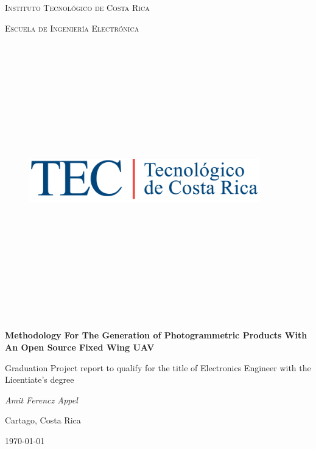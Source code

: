 \begin{titlepage}
	\centering
	{\scshape\LARGE Instituto Tecnológico de Costa Rica \par}
	\vspace{1cm}
    {\scshape\Large Escuela de Ingeniería Electrónica \par}
    \vspace{1cm}
    
    \begin{figure}[hb]
	\centering
	\includegraphics[width=10cm,height=12cm,keepaspectratio]{imagenes/tec.png}
	\end{figure}
    
	\vspace{1cm}
	{\LARGE\bfseries Methodology For The Generation of Photogrammetric Products With An Open Source Fixed Wing UAV\par}
	\vspace{1cm}
    {\LARGE Graduation Project report to qualify for the title of Electronics Engineer with the Licentiate's degree
\par}
    \vspace{1cm}
    {\LARGE\itshape Amit Ferencz Appel\par}
    \vfill
	{\Large Cartago, Costa Rica\par}

	{\large \today\par}
\end{titlepage}